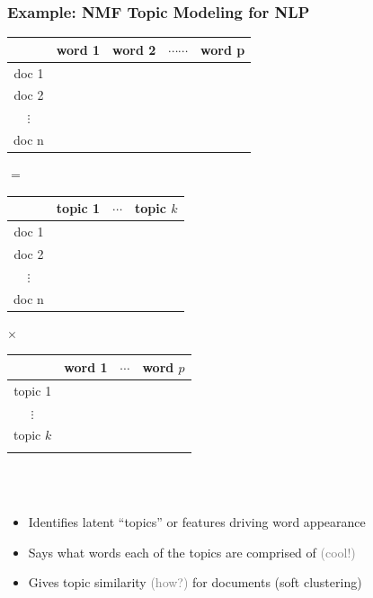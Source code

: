 \documentclass[xcolor={dvipsnames}]{beamer}
\begin{document}
\frame
{
\frametitle{Example: NMF Topic Modeling for NLP}
\small
\hspace{.8em}\begin{tabular}{c|cccc}
& word 1 & word 2 & $\cdots\cdots$ & word p \\ \hline
doc 1 & \\
doc 2 & \\
$\vdots$ & \\
doc n & \\
\end{tabular}

\vspace{2em} 

$=$\begin{tabular}{c|ccc}
& topic 1 & $\cdots$ & topic $k$ \\ \hline
doc 1 & \\
doc 2 & \\
$\vdots$ & \\
doc n & \\
\end{tabular}$\times$\begin{tabular}{c|ccc}
& word 1 & $\cdots$ & word $p$ \\ \hline
topic 1 & \\
$\vdots$ & \\
topic $k$\\
\\
\end{tabular}

\normalsize
${}$\\${}$\\
\begin{itemize}
\item Identifies latent ``topics'' or features driving word appearance 
\item Says what words each of the topics are comprised of \textcolor{gray}{(cool!)}
\item Gives topic similarity \textcolor{gray}{(how?)} for documents (soft clustering)
\end{itemize}

}
\end{document}

